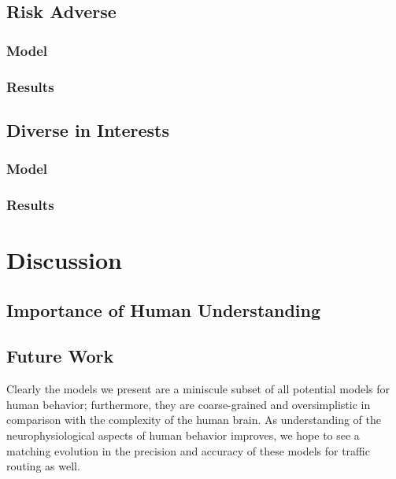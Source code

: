 \documentclass[acmlarge]{acmart}
\begin{document}
\subsection{Risk Adverse}
\subsubsection{Model}
\subsubsection{Results}

\subsection{Diverse in Interests}
\subsubsection{Model}
\subsubsection{Results}


\section{Discussion}
\subsection{Importance of Human Understanding}
\subsection{Future Work}
Clearly the models we present are a miniscule subset of all potential models for human behavior; 
furthermore, they are coarse-grained and oversimplistic in comparison with the complexity of the human
brain. As understanding of the neurophysiological aspects of human behavior improves, we hope to see a matching evolution in the precision and accuracy of these models for traffic routing as well.



\end{document}
